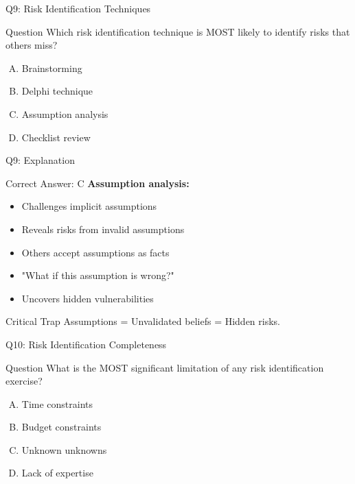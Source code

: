 \documentclass{beamer}
\begin{document}
		\begin{frame}{Q9: Risk Identification Techniques}
			\begin{block}{Question}
				Which risk identification technique is MOST likely to identify risks that others miss?
			\end{block}
			\begin{enumerate}[(A)]
				\item Brainstorming
				\item Delphi technique
				\item Assumption analysis
				\item Checklist review
			\end{enumerate}
		\end{frame}
		
		\begin{frame}{Q9: Explanation}
			\begin{block}{Correct Answer: C}
				\textbf{Assumption analysis:}
				\begin{itemize}
					\item Challenges implicit assumptions
					\item Reveals risks from invalid assumptions
					\item Others accept assumptions as facts
					\item "What if this assumption is wrong?"
					\item Uncovers hidden vulnerabilities
				\end{itemize}
			\end{block}
			\begin{alertblock}{Critical Trap}
				Assumptions = Unvalidated beliefs = Hidden risks.
			\end{alertblock}
		\end{frame}
		
		\begin{frame}{Q10: Risk Identification Completeness}
			\begin{block}{Question}
				What is the MOST significant limitation of any risk identification exercise?
			\end{block}
			\begin{enumerate}[(A)]
				\item Time constraints
				\item Budget constraints
				\item Unknown unknowns
				\item Lack of expertise
			\end{enumerate}
		\end{frame}
		
\end{document}
